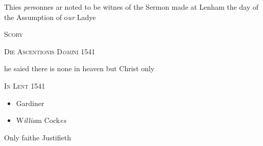 \documentclass[12pt, a4paper]{book}
\begin{document}
		\ifthenelse{\isodd{\thepage}}
		{\reversemarginpar}
		{\normalmarginpar}
		 Thies \textit{per}sonnes ar noted to be witnes of the Sermon made at Lenham the day of the Assumption of o\textit{ur} Ladye
 

            
            
            
               
				\begin{center} \begin{large} {\scshape Scory
			} \end{large} \end{center}
			
               
                  
				\begin{center}  {\scshape 
                     Die Ascentionis D\textit{omi}ni 1541
                  }  \end{center}
			


	
				\marginpar[\vspace{0.5cm}{\textcolor{Gray}{Brandkirk Shether Joan Marden  Robert Colman}}]{}
			 
		\ifthenelse{\isodd{\thepage}}
		{\reversemarginpar}
		{\normalmarginpar}
		he saied there is none in heaven but Christ only



               
                  
				\begin{center}  {\scshape In Lent 1541
                  }  \end{center}
			
               	
               		
               			\begin{itemize}
               				\item[]Gardiner
               				\item[]W\textit{illia}m Cock\textit{es}
               			\end{itemize}
               			
			
               		
		\ifthenelse{\isodd{\thepage}}
		{\reversemarginpar}
		{\normalmarginpar}
		Only faithe Justifieth
               	
               	
               		
\end{document}
